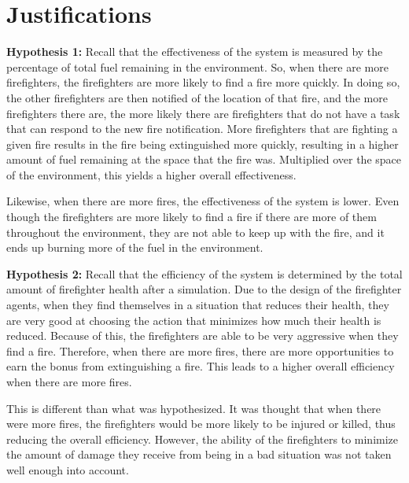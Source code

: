 \documentclass{article}
\begin{document}
\section{Justifications}

  \begin{description}

    \item \textbf{Hypothesis 1:}
      Recall that the effectiveness of the system is measured by the percentage
      of total fuel remaining in the environment.  So, when there are more
      firefighters, the firefighters are more likely to find a fire more quickly.
      In doing so, the other firefighters are then notified of the location
      of that fire, and the more firefighters there are, the more likely there
      are firefighters that do not have a task that can respond to the new fire
      notification.  More firefighters that are fighting a given fire results
      in the fire being extinguished more quickly, resulting in a higher amount
      of fuel remaining at the space that the fire was.  Multiplied over the
      space of the environment, this yields a higher overall effectiveness.

      Likewise, when there are more fires, the effectiveness of the system
      is lower.  Even though the firefighters are more likely to find a fire
      if there are more of them throughout the environment, they are not
      able to keep up with the fire, and it ends up burning more of the
      fuel in the environment.

    \item \textbf{Hypothesis 2:}
      Recall that the efficiency of the system is determined by the total amount
      of firefighter health after a simulation.  Due to the design of the
      firefighter agents, when they find themselves in a situation that reduces
      their health, they are very good at choosing the action that minimizes
      how much their health is reduced.  Because of this, the firefighters are
      able to be very aggressive when they find a fire.  Therefore, when there are
      more fires, there are more opportunities to earn the bonus from extinguishing
      a fire.  This leads to a higher overall efficiency when there are more
      fires.

      This is different than what was hypothesized.  It was thought that when
      there were more fires, the firefighters would be more likely to be
      injured or killed, thus reducing the overall efficiency.  However, the
      ability of the firefighters to minimize the amount of damage they
      receive from being in a bad situation was not taken well enough into
      account.


\end{description}
\end{document}
